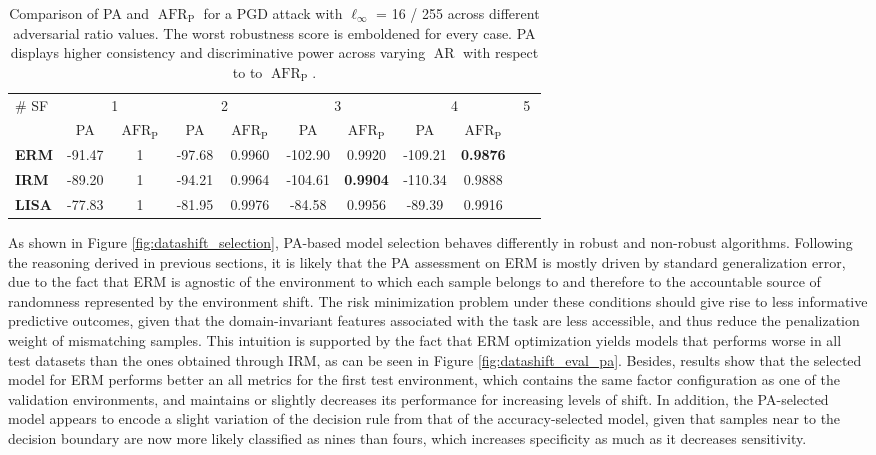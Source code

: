 \begin{table}[h]
    \centering
    \begin{tabular}{l|cc|cc|cc|cc|cc}
    \multirow{2}{*}{\# SF} & \multicolumn{2}{c|}{1} & \multicolumn{2}{c|}{2} & \multicolumn{2}{c|}{3} & \multicolumn{2}{c}{4} & \multicolumn{2}{c}{5} \\
    & PA & $\operatorname{AFR}_{\text{P}}$ & PA & $\operatorname{AFR}_{\text{P}}$ & PA & $\operatorname{AFR}_{\text{P}}$ & PA & $\operatorname{AFR}_{\text{P}}$ \\
    \midrule
    {\color{tab:blue} \textbf{ERM}} & -91.47 & 1 & -97.68 & 0.9960 & -102.90 & 0.9920 & -109.21 & \textbf{0.9876} \\
    {\color{tab:orange} \textbf{IRM}} & -89.20 & 1 & -94.21 & 0.9964 & -104.61 & \textbf{0.9904} & -110.34 & 0.9888 \\
    {\color{tab:green} \textbf{LISA}} & -77.83 & 1 & -81.95 & 0.9976 & -84.58 & 0.9956 & -89.39 & 0.9916 \\
    \bottomrule
    \end{tabular}
    \caption{
        Comparison of PA and $\operatorname{AFR}_{\text{P}}$ for a 
        PGD attack with $\ell_\infty$ = 16 / 255 across different adversarial 
        ratio values. The worst robustness score is emboldened for every case.
        PA displays higher consistency and discriminative power 
        across varying $\operatorname{AR}$ with respect to to 
        $\operatorname{AFR}_{\text{P}}$.
    }
    \label{tab:pa_afrpred_comparison_table}
\end{table}

As shown in Figure \ref{fig:datashift_selection}, PA-based model selection behaves differently in robust
and non-robust algorithms. Following the reasoning derived in previous sections, it is likely that the PA
assessment on ERM is mostly driven by standard generalization error, due to the fact that ERM is agnostic
of the environment to which each sample belongs to and therefore to the accountable source of randomness represented
by the environment shift. The risk minimization problem under these conditions should give rise to less informative
predictive outcomes, given that the domain-invariant features associated with the task are less accessible, and
thus reduce the penalization weight of mismatching samples. This intuition is supported by the fact that ERM
optimization yields models that performs worse in all test datasets than the ones obtained through IRM,
as can be seen in Figure \ref{fig:datashift_eval_pa}. Besides, results show that the selected model for ERM 
performs better an all metrics for the first test environment, which contains
the same factor configuration as one of the validation environments, and maintains or slightly decreases its performance
for increasing levels of shift. In addition, the PA-selected model appears to encode a slight variation of the 
decision rule from that of the accuracy-selected model, given that samples near to the decision boundary are now
more likely classified as nines than fours, which increases specificity as much as it decreases sensitivity. \\

